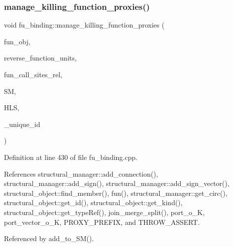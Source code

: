 \subsubsection{\texorpdfstring{manage\+\_\+killing\+\_\+function\+\_\+proxies()}{manage\_killing\_function\_proxies()}}
{\footnotesize\ttfamily void fu\+\_\+binding\+::manage\+\_\+killing\+\_\+function\+\_\+proxies (\begin{DoxyParamCaption}\item[{std\+::map$<$ unsigned int, \hyperlink{structural__objects_8hpp_a8ea5f8cc50ab8f4c31e2751074ff60b2}{structural\+\_\+object\+Ref} $>$ \&}]{fun\+\_\+obj,  }\item[{std\+::map$<$ std\+::string, unsigned int $>$ \&}]{reverse\+\_\+function\+\_\+units,  }\item[{std\+::map$<$ std\+::string, std\+::list$<$ \hyperlink{structural__objects_8hpp_a8ea5f8cc50ab8f4c31e2751074ff60b2}{structural\+\_\+object\+Ref} $>$$>$ \&}]{fun\+\_\+call\+\_\+sites\+\_\+rel,  }\item[{const \hyperlink{structural__manager_8hpp_ab3136f0e785d8535f8d252a7b53db5b5}{structural\+\_\+manager\+Ref}}]{SM,  }\item[{const \hyperlink{hls_8hpp_a75d0c73923d0ddfa28c4843a802c73a7}{hls\+Ref}}]{H\+LS,  }\item[{unsigned int \&}]{\+\_\+unique\+\_\+id }\end{DoxyParamCaption})\hspace{0.3cm}{\ttfamily [protected]}}



Definition at line 430 of file fu\+\_\+binding.\+cpp.



References structural\+\_\+manager\+::add\+\_\+connection(), structural\+\_\+manager\+::add\+\_\+sign(), structural\+\_\+manager\+::add\+\_\+sign\+\_\+vector(), structural\+\_\+object\+::find\+\_\+member(), fun(), structural\+\_\+manager\+::get\+\_\+circ(), structural\+\_\+object\+::get\+\_\+id(), structural\+\_\+object\+::get\+\_\+kind(), structural\+\_\+object\+::get\+\_\+type\+Ref(), join\+\_\+merge\+\_\+split(), port\+\_\+o\+\_\+K, port\+\_\+vector\+\_\+o\+\_\+K, P\+R\+O\+X\+Y\+\_\+\+P\+R\+E\+F\+IX, and T\+H\+R\+O\+W\+\_\+\+A\+S\+S\+E\+RT.



Referenced by add\+\_\+to\+\_\+\+S\+M().

